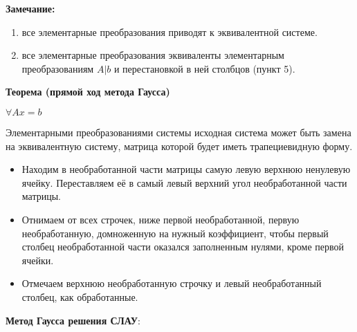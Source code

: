 \textbf{Замечание:}
\begin{enumerate}
    \item все элементарные преобразования приводят к эквивалентной системе.
    \item все элементарные преобразования эквиваленты элементарным преобразованиям \(A | b\) и перестановкой в ней столбцов (пункт 5).
\end{enumerate}

\textbf{Теорема (прямой ход метода Гаусса)}

\(\forall Ax = b\)

Элементарными преобразованиями системы исходная система может быть замена на эквивалентную систему, матрица которой будет иметь трапециевидную форму.

\begin{itemize}
    \item Находим в необработанной части матрицы самую левую верхнюю ненулевую ячейку. Переставляем её в самый левый верхний угол необработанной части матрицы.

    \item Отнимаем от всех строчек, ниже первой необработанной, первую необработанную, домноженную на нужный коэффициент, чтобы первый столбец необработанной части оказался заполненным нулями, кроме первой ячейки.

    \item Отмечаем верхнюю необработанную строчку и левый необработанный столбец, как обработанные.
\end{itemize}

\textbf{Метод Гаусса решения СЛАУ}:

